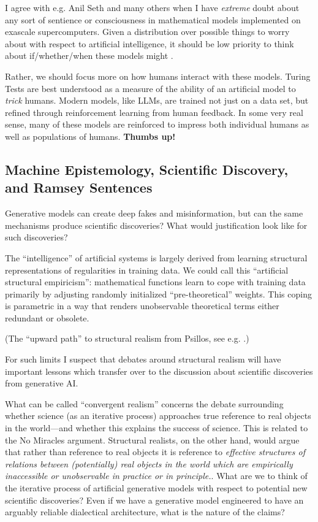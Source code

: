 \documentclass[11pt, oneside]{article}   	%
\begin{document}
I agree with e.g. Anil Seth and many others when I have \emph{extreme} doubt about any sort of sentience or consciousness in mathematical models implemented on exascale supercomputers.  Given a distribution over possible things to worry about with respect to artificial intelligence, it should be low priority to think about if/whether/when these models might .

Rather, we should focus more on how humans interact with these models.  Turing Tests are best understood as a measure of the ability of an artificial model to \emph{trick} humans.  Modern models, like LLMs, are trained not just on a data set, but refined through reinforcement learning from human feedback. In some very real sense, many of these models are reinforced to impress both individual humans as well as populations of humans.  \textbf{Thumbs up!}


\subsection{Machine Epistemology, Scientific Discovery, and Ramsey Sentences}

Generative models can create deep fakes and misinformation, but can the same mechanisms produce scientific discoveries?  What would justification look like for such discoveries?




The ``intelligence'' of artificial systems is largely derived from learning structural representations of regularities in training data. We could call this ``artificial structural empiricism'': mathematical functions learn to cope with training data primarily by adjusting randomly initialized ``pre-theoretical'' weights.  This coping is parametric in a way that renders unobservable theoretical terms either redundant or obsolete.  

(The ``upward path'' to structural realism from Psillos, see e.g. \citep[\S 3]{sep-structural-realism}.)

For such limits I suspect that debates around structural realism will have important lessons which transfer over to the discussion about scientific discoveries from generative AI.  

What can be called ``convergent realism'' concerns the debate surrounding whether science (as an iterative process) approaches true reference to real objects in the world---and whether this explains the success of science.  This is related to the No Miracles argument.  Structural realists, on the other hand, would argue that rather than reference to real objects it is reference to \emph{effective structures of relations between (potentially) real objects in the world which are empirically inaccessible or unobservable in practice or in principle.}.  What are we to think of the iterative process of artificial generative models with respect to potential new scientific discoveries? Even if we have a generative model engineered to have an arguably reliable dialectical architecture, what is the nature of the claims?  
\end{document}
